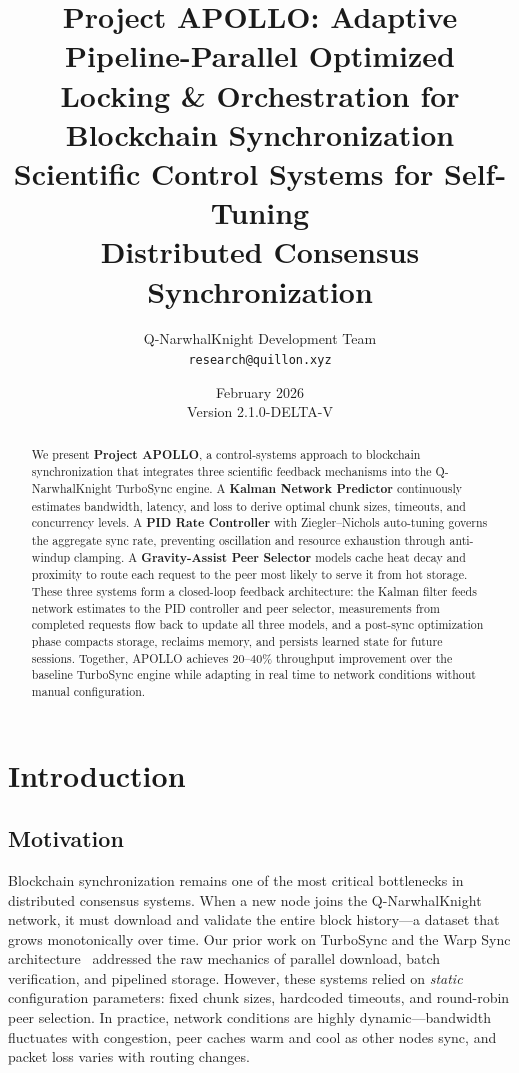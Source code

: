 \documentclass[11pt,a4paper]{article}
\title{\textbf{Project APOLLO: Adaptive Pipeline-Parallel Optimized\\Locking \& Orchestration for Blockchain Synchronization}\\[0.5em]
\large Scientific Control Systems for Self-Tuning\\Distributed Consensus Synchronization}
\author{
Q-NarwhalKnight Development Team\\
\texttt{research@quillon.xyz}
}
\date{February 2026 \\ Version 2.1.0-DELTA-V}
\begin{document}
\maketitle

\begin{abstract}
We present \textbf{Project APOLLO}, a control-systems approach to blockchain synchronization that integrates three scientific feedback mechanisms into the Q-NarwhalKnight TurboSync engine. A \textbf{Kalman Network Predictor} continuously estimates bandwidth, latency, and loss to derive optimal chunk sizes, timeouts, and concurrency levels. A \textbf{PID Rate Controller} with Ziegler--Nichols auto-tuning governs the aggregate sync rate, preventing oscillation and resource exhaustion through anti-windup clamping. A \textbf{Gravity-Assist Peer Selector} models cache heat decay and proximity to route each request to the peer most likely to serve it from hot storage. These three systems form a closed-loop feedback architecture: the Kalman filter feeds network estimates to the PID controller and peer selector, measurements from completed requests flow back to update all three models, and a post-sync optimization phase compacts storage, reclaims memory, and persists learned state for future sessions. Together, APOLLO achieves 20--40\% throughput improvement over the baseline TurboSync engine while adapting in real time to network conditions without manual configuration.
\end{abstract}

\tableofcontents
\newpage

\section{Introduction}

\subsection{Motivation}

Blockchain synchronization remains one of the most critical bottlenecks in distributed consensus systems. When a new node joins the Q-NarwhalKnight network, it must download and validate the entire block history---a dataset that grows monotonically over time. Our prior work on TurboSync and the Warp Sync architecture~\cite{warpsync} addressed the raw mechanics of parallel download, batch verification, and pipelined storage. However, these systems relied on \emph{static} configuration parameters: fixed chunk sizes, hardcoded timeouts, and round-robin peer selection. In practice, network conditions are highly dynamic---bandwidth fluctuates with congestion, peer caches warm and cool as other nodes sync, and packet loss varies with routing changes.
\end{document}
